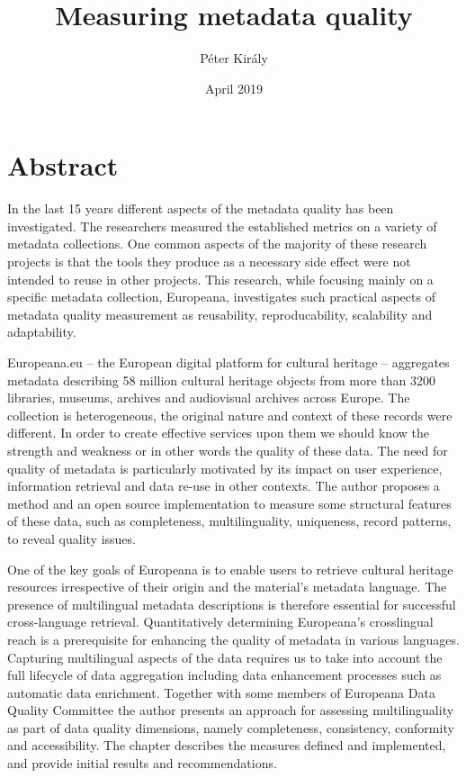 \documentclass{article}
\title{Measuring metadata quality}
\author{Péter Király}
\date{April 2019}
\begin{document}
\maketitle

\section{Abstract}

In the last 15 years different aspects of the metadata quality has been investigated. The researchers measured the established metrics on a variety of metadata collections. One common aspects of the majority of these research projects is that the tools they produce as a necessary side effect were not intended to reuse in other projects. This research, while focusing mainly on a specific metadata collection, Europeana, investigates such practical aspects of metadata quality measurement as reusability, reproducability, scalability and adaptability.

Europeana.eu -- the European digital platform for cultural heritage -- aggregates metadata describing 58 million cultural heritage objects from more than 3200 libraries, museums, archives and audiovisual archives across Europe. The collection is heterogeneous, the original nature and context of these records were different. In order to create effective services upon them we should know the strength and weakness or in other words the quality of these data. The need for quality of metadata is particularly motivated by its impact on user experience, information retrieval and data re-use in other contexts. The author proposes a method and an open source implementation to measure some structural features of these data, such as completeness, multilinguality, uniqueness, record patterns, to reveal quality issues.

One of the key goals of Europeana is to enable users to retrieve cultural heritage resources irrespective of their origin and the material’s metadata language. The presence of multilingual metadata descriptions is therefore essential for successful cross-language retrieval. Quantitatively determining Europeana’s crosslingual reach is a prerequisite for enhancing the quality of metadata in various languages. Capturing multilingual aspects of the data requires us to take into account the full lifecycle of data aggregation including data enhancement processes such as automatic data enrichment. Together with some members of Europeana Data Quality Committee the author presents an approach for assessing multilinguality as part of data quality dimensions, namely completeness, consistency, conformity and accessibility. The chapter describes the measures defined and implemented, and provide initial results and recommendations.
\end{document}
